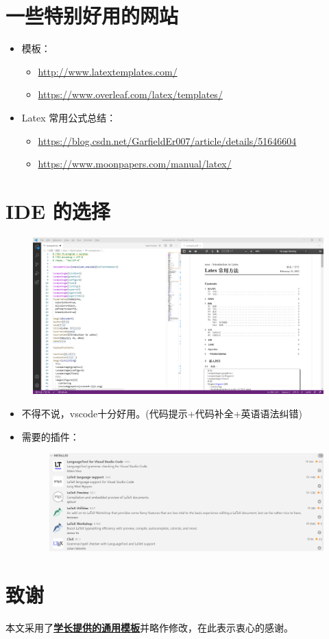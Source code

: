 \documentclass[onecolumn,oneside]{SUSTechHomework}
\begin{document}
\section{一些特别好用的网站}
\begin{itemize}
  \item 模板：
  \begin{itemize}
    \item \href{http://www.latextemplates.com/}{http://www.latextemplates.com/}
    \item \href{https://www.overleaf.com/latex/templates/}{https://www.overleaf.com/latex/templates/}
  \end{itemize}
  \item Latex 常用公式总结：
  \begin{itemize}
    \item \href{https://blog.csdn.net/GarfieldEr007/article/details/51646604}{https://blog.csdn.net/GarfieldEr007/article/details/51646604}
    \item \href{https://www.moonpapers.com/manual/latex/}{https://www.moonpapers.com/manual/latex/}
  \end{itemize}
\end{itemize}
\section{IDE 的选择}
\begin{figure}[H]
  \centering
  \includegraphics[width=170mm]{figures/3.png}
\end{figure}
\begin{itemize}
  \item 不得不说，vscode十分好用。(代码提示+代码补全+英语语法纠错)
  \item 需要的插件：
  \begin{figure}[H]
    \centering
    \includegraphics[width=170mm]{figures/4.png}
  \end{figure}
\end{itemize}
\section{致谢}
本文采用了\textbf{\href{https://github.com/ziqin/LaTeX-SUSTechHomework}{学长提供的通用模板}}并略作修改，在此表示衷心的感谢。
\end{document}
